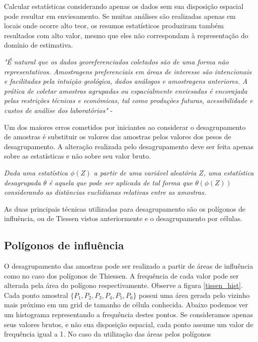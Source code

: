 Calcular estatísticas considerando apenas os dados sem sua disposição espacial pode resultar em enviesamento. Se muitas análises são realizadas apenas em locais onde ocorre alto teor, os resumos estatísticos produziram também resultados com alto valor, mesmo que eles não correspondam à representação do domínio de estimativa. 

\begin{remark}
	\textit{"É natural que os dados georeferenciados coletados são de uma forma não representativos. Amostragens preferenciais em áreas de interesse são intencionais e facilitadas pela intuição geológica, dados análogos e amostragens anteriores. A prática de coletar amostras agrupadas ou espacialmente enviesadas é encorajada pelas restrições técnicas e econômicas, tal como produções futuras, acessibilidade e custos de análise dos laboratórios"} -\cite{pyrcz2003declustering}
\end{remark}

Um dos maiores erros cometidos por iniciantes ao considerar o desagrupamento de amostras é substituir os valores das amostras pelos valores dos pesos de desagrupamento. A alteração realizada pelo desagrupamento deve ser feita apenas sobre as estatísticas e não sobre seu valor bruto. 

\begin{definition}[Desagrupamento]
	\textit{Dada uma estatística $\phi(Z)$ a partir de uma variável aleatória $Z$, uma estatística desagrupada $\theta$ é aquela que pode ser aplicada de tal forma que $\theta(\phi(Z))$ considerando as distâncias euclidianas relativas entre as amostras.}  
\end{definition}


As duas principais técnicas utilizadas para desagrupamento são os polígonos de influência, ou de Tiessen vistos anteriormente e o desagrupamento por células.





\subsection{Polígonos de influência} 

O desagrupamento das amostras pode ser realizado a partir de áreas de influência como no caso dos polígonos de Thiessen. A frequência de cada valor pode ser alterada pela área do polígono respectivamente. Observe a figura \ref{tissen_hist}. Cada ponto amostral $\{P_{1},P_{2},P_{3},P_{4},P_{5}, P_{6} \}$ possui uma área gerada pelo vizinho mais próximo em um grid de tamanho de célula conhecida. Abaixo podemos ver um histograma representando a frequência destes pontos. Se consideramos apenas seus valores brutos, e não sua disposição espacial, cada ponto assume um valor de frequência igual a 1. No caso da utilização das áreas pelos polígonos  

